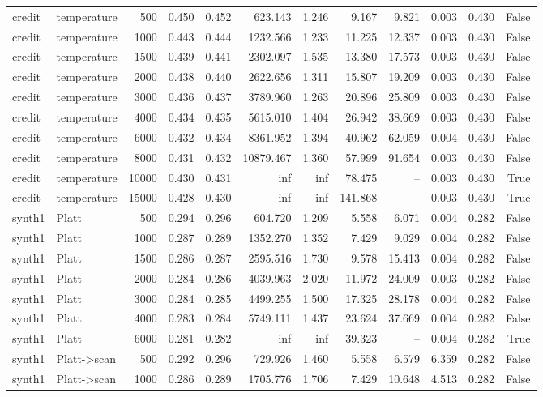 \begin{tabular}{llrrrrrrrrrr}
credit & temperature & 500 & 0.450 & 0.452 & 623.143 & 1.246 & 9.167 & 9.821 & 0.003 & 0.430 & False \\
credit & temperature & 1000 & 0.443 & 0.444 & 1232.566 & 1.233 & 11.225 & 12.337 & 0.003 & 0.430 & False \\
credit & temperature & 1500 & 0.439 & 0.441 & 2302.097 & 1.535 & 13.380 & 17.573 & 0.003 & 0.430 & False \\
credit & temperature & 2000 & 0.438 & 0.440 & 2622.656 & 1.311 & 15.807 & 19.209 & 0.003 & 0.430 & False \\
credit & temperature & 3000 & 0.436 & 0.437 & 3789.960 & 1.263 & 20.896 & 25.809 & 0.003 & 0.430 & False \\
credit & temperature & 4000 & 0.434 & 0.435 & 5615.010 & 1.404 & 26.942 & 38.669 & 0.003 & 0.430 & False \\
credit & temperature & 6000 & 0.432 & 0.434 & 8361.952 & 1.394 & 40.962 & 62.059 & 0.004 & 0.430 & False \\
credit & temperature & 8000 & 0.431 & 0.432 & 10879.467 & 1.360 & 57.999 & 91.654 & 0.003 & 0.430 & False \\
credit & temperature & 10000 & 0.430 & 0.431 & inf & inf & 78.475 & -- & 0.003 & 0.430 & True \\
credit & temperature & 15000 & 0.428 & 0.430 & inf & inf & 141.868 & -- & 0.003 & 0.430 & True \\
synth1 & Platt & 500 & 0.294 & 0.296 & 604.720 & 1.209 & 5.558 & 6.071 & 0.004 & 0.282 & False \\
synth1 & Platt & 1000 & 0.287 & 0.289 & 1352.270 & 1.352 & 7.429 & 9.029 & 0.004 & 0.282 & False \\
synth1 & Platt & 1500 & 0.286 & 0.287 & 2595.516 & 1.730 & 9.578 & 15.413 & 0.004 & 0.282 & False \\
synth1 & Platt & 2000 & 0.284 & 0.286 & 4039.963 & 2.020 & 11.972 & 24.009 & 0.003 & 0.282 & False \\
synth1 & Platt & 3000 & 0.284 & 0.285 & 4499.255 & 1.500 & 17.325 & 28.178 & 0.004 & 0.282 & False \\
synth1 & Platt & 4000 & 0.283 & 0.284 & 5749.111 & 1.437 & 23.624 & 37.669 & 0.004 & 0.282 & False \\
synth1 & Platt & 6000 & 0.281 & 0.282 & inf & inf & 39.323 & -- & 0.004 & 0.282 & True \\
synth1 & Platt->scan & 500 & 0.292 & 0.296 & 729.926 & 1.460 & 5.558 & 6.579 & 6.359 & 0.282 & False \\
synth1 & Platt->scan & 1000 & 0.286 & 0.289 & 1705.776 & 1.706 & 7.429 & 10.648 & 4.513 & 0.282 & False \\

\end{tabular}
